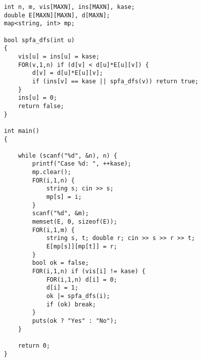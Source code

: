 \begin{lstlisting}
int n, m, vis[MAXN], ins[MAXN], kase;
double E[MAXN][MAXN], d[MAXN];
map<string, int> mp;

bool spfa_dfs(int u)
{
    vis[u] = ins[u] = kase;
    FOR(v,1,n) if (d[v] < d[u]*E[u][v]) {
        d[v] = d[u]*E[u][v];
        if (ins[v] == kase || spfa_dfs(v)) return true;
    }
    ins[u] = 0;
    return false;
}

int main()
{

    while (scanf("%d", &n), n) {
        printf("Case %d: ", ++kase);
        mp.clear();
        FOR(i,1,n) {
            string s; cin >> s;
            mp[s] = i;
        }
        scanf("%d", &m);
        memset(E, 0, sizeof(E));
        FOR(i,1,m) {
            string s, t; double r; cin >> s >> r >> t;
            E[mp[s]][mp[t]] = r;
        }
        bool ok = false;
        FOR(i,1,n) if (vis[i] != kase) {
            FOR(i,1,n) d[i] = 0;
            d[i] = 1;
            ok |= spfa_dfs(i);
            if (ok) break;
        }
        puts(ok ? "Yes" : "No");
    }

    return 0;
}
\end{lstlisting}